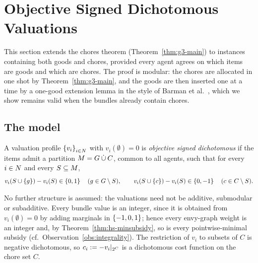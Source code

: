 \section{Objective Signed Dichotomous Valuations}
\label{sec:objective-signed}

This section extends the chores theorem (Theorem~\ref{thm:g3-main}) to
instances containing both goods and chores, provided every agent agrees on
which items are goods and which are chores. The proof is modular: the chores
are allocated in one shot by Theorem~\ref{thm:g3-main}, and the goods are then
inserted one at a time by a one-good extension lemma in the style of Barman et
al.~\cite{BKNS22}, which we show remains valid when the bundles already contain
chores.

\subsection{The model}

\begin{definition}
\label{def:os-domain}
A valuation profile $\left\{v_i\right\}_{i\in N}$ with $v_i(\emptyset)=0$ is
\emph{objective signed dichotomous} if the items admit a partition
$M=G\mathbin{\dot\cup}C$, common to all agents, such that for every
$i\in N$ and every $S\subseteq M$,
\[
  v_i(S\cup\left\{g\right\})-v_i(S)\in\left\{0,1\right\}\quad(g\in G\setminus S),
  \qquad
  v_i(S\cup\left\{c\right\})-v_i(S)\in\left\{0,-1\right\}\quad(c\in C\setminus S).
\]
\end{definition}

No further structure is assumed: the valuations need not be additive,
submodular or subadditive. Every bundle value is an integer, since it is
obtained from $v_i(\emptyset)=0$ by adding marginals in $\left\{-1,0,1\right\}$; hence
every envy-graph weight is an integer and, by Theorem~\ref{thm:hs-minsubsidy},
so is every pointwise-minimal subsidy (cf.\ Observation~\ref{obs:integrality}).
The restriction of $v_i$ to subsets of $C$ is negative dichotomous, so
$c_i:=-v_i|_{2^C}$ is a dichotomous cost function on the chore set $C$.


